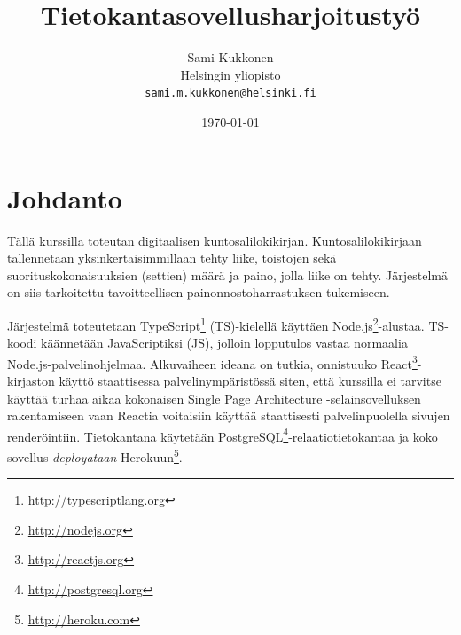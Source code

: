 \documentclass{article}
\begin{document}
\title{Tietokantasovellusharjoitustyö}
\author{Sami Kukkonen\\Helsingin yliopisto\\\texttt{sami.m.kukkonen@helsinki.fi}}
\date{\today}
\maketitle
\section{Johdanto}
Tällä kurssilla toteutan digitaalisen kuntosalilokikirjan.
Kuntosalilokikirjaan tallennetaan yksinkertaisimmillaan tehty liike, toistojen sekä suorituskokonaisuuksien (settien) määrä ja paino, jolla liike on tehty.
Järjestelmä on siis tarkoitettu tavoitteellisen painonnostoharrastuksen tukemiseen.
\par
Järjestelmä toteutetaan TypeScript\footnote{\url{http://typescriptlang.org}} (TS)-kielellä käyttäen Node.js\footnote{\url{http://nodejs.org}}-alustaa. TS-koodi käännetään JavaScriptiksi (JS), jolloin lopputulos vastaa normaalia Node.js-palvelinohjelmaa. Alkuvaiheen ideana on tutkia, onnistuuko React\footnote{\url{http://reactjs.org}}-kirjaston käyttö staattisessa palvelinympäristössä siten, että kurssilla ei tarvitse käyttää turhaa aikaa kokonaisen Single Page Architecture -selainsovelluksen rakentamiseen vaan Reactia voitaisiin käyttää staattisesti palvelinpuolella sivujen renderöintiin. Tietokantana käytetään PostgreSQL\footnote{\url{http://postgresql.org}}-relaatiotietokantaa ja koko sovellus \textit{deployataan} Herokuun\footnote{\url{http://heroku.com}}.
\end{document}
